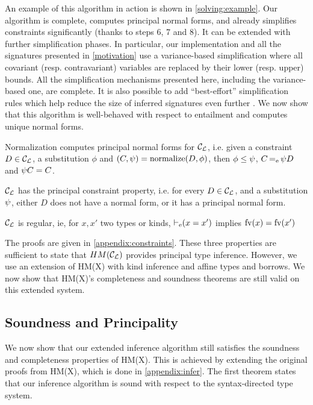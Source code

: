 An example of this algorithm in action is shown in \cref{solving:example}.
Our algorithm is complete, computes principal normal forms,
and already simplifies constraints significantly
(thanks to steps 6, 7 and 8).
It can be extended with further simplification phases.
In particular, our implementation and all the signatures presented in
\cref{motivation} use a variance-based simplification
where all covariant (resp. contravariant) variables are replaced by their
lower (resp. upper) bounds.
All the simplification mechanisms presented
here, including the variance-based one, are complete.
It is also possible to add ``best-effort'' simplification
rules which help reduce the size of inferred signatures even further
\citep{DBLP:conf/aplas/Simonet03}.
%
We now show that this algorithm is well-behaved with respect to entailment
and computes unique normal forms.

\begin{property}
  Normalization computes principal normal forms for ${\mathcal C_{\mathcal L}}$, i.e.
  given a constraint $D\in{\mathcal C_{\mathcal L}}$, a substitution $\phi$ and
  $(C,\mathrm{\psi}) = \operatorname{normalize}(D,\phi)$,
  then $\phi\leq\mathrm{\psi}$,
  $C \operatorname{=_e} \mathrm{\psi} D$ and
  $\mathrm{\psi} C = C$.
\end{property}

\begin{property}
  ${\mathcal C_{\mathcal L}}$ has the principal constraint property, i.e.
  for every $D\in{\mathcal C_{\mathcal L}}$, and a substitution $\mathrm{\psi}$,
  either $D$ does not have a normal form, or it has
  a principal normal form.
\end{property}

\begin{property}
  ${\mathcal C_{\mathcal L}}$ is regular, ie, for $x, x'$ two types or kinds,
  $\operatorname{\vdash_e} (x = x')$ implies
  $\operatorname{fv}(x) = \operatorname{fv}(x')$
\end{property}

The proofs are given in \cref{appendix:constraints}. These three properties
are sufficient to state that $HM({\mathcal C_{\mathcal L}})$ provides principal type inference.
However, we use an extension of HM(X) with kind inference
and affine types and borrows.
We now show that HM(X)'s completeness and soundness theorems are still valid on
this extended system.

\subsection{Soundness and Principality}

We now show that our extended inference algorithm still satisfies the soundness
and completeness properties of HM(X). This is achieved by extending
the original proofs from HM(X), which is done in \cref{appendix:infer}.
%
The first theorem states that our inference algorithm is sound
with respect to the syntax-directed type system.

